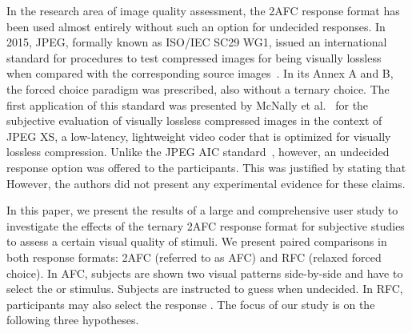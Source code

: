 \documentclass[a4paper,conference]{IEEEtran}
\begin{document}
In the research area of image quality assessment, the 2AFC response format has been used almost entirely without such an option for undecided responses. In 2015, JPEG, formally known as ISO/IEC SC29 WG1, issued an international standard for procedures to test compressed images for being visually lossless when compared with the corresponding source images~\cite{ISOIEC2015}. In its Annex A and B, the forced choice paradigm was prescribed, also without a ternary choice. The first application of this standard was presented by McNally et al.~\cite{mcnally2017jpeg} for the subjective evaluation of visually lossless compressed images in the context of JPEG XS, a low-latency, lightweight video coder that is optimized for visually lossless compression. Unlike the JPEG AIC standard~\cite{ISOIEC2015}, however, an undecided response option was offered to the participants. This was justified by stating that  However, the authors did not present any experimental evidence for these claims.



In this paper, we present the results of a large and comprehensive user study to investigate the effects of the ternary 2AFC response format for subjective studies to assess a certain visual quality of stimuli. We present paired comparisons in both response formats: 2AFC (referred to as AFC) and RFC (relaxed forced choice). In AFC, subjects are shown two visual patterns side-by-side and have to select the  or  stimulus. Subjects are instructed to guess when undecided. In RFC, participants may also select the response .  
The focus of our study is on the following three hypotheses.
\end{document}
